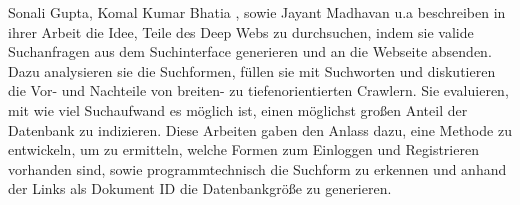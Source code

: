 Sonali Gupta, Komal Kumar Bhatia \cite{gupta2014comparative}, sowie Jayant Madhavan u.a \cite{madhavan2008google} beschreiben in ihrer Arbeit die Idee, Teile des Deep Webs zu durchsuchen, indem sie valide Suchanfragen aus dem Suchinterface generieren und an die Webseite absenden. Dazu analysieren sie die Suchformen, füllen sie mit Suchworten und diskutieren die Vor- und Nachteile von breiten- zu tiefenorientierten Crawlern. Sie evaluieren, mit wie viel Suchaufwand es möglich ist, einen möglichst großen Anteil der Datenbank zu indizieren. Diese Arbeiten gaben den Anlass dazu, eine Methode zu entwickeln, um zu ermitteln, welche Formen zum Einloggen und Registrieren vorhanden sind, sowie programmtechnisch die Suchform zu erkennen und anhand der Links als Dokument ID die Datenbankgröße zu generieren.

